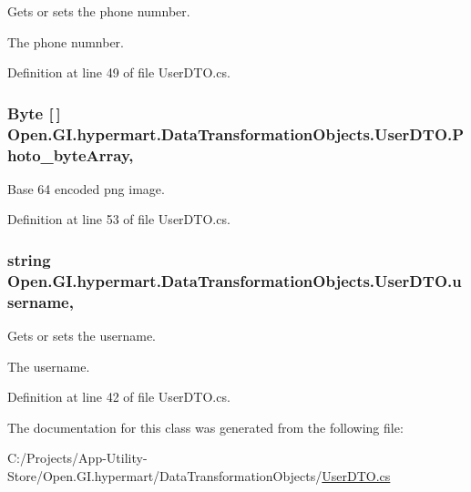 Gets or sets the phone numnber. 

The phone numnber. 

Definition at line 49 of file User\+D\+T\+O.\+cs.

\hypertarget{class_open_1_1_g_i_1_1hypermart_1_1_data_transformation_objects_1_1_user_d_t_o_a3e4447b4cd2ef861c95c1e9162cbceb1}{}
\subsubsection[{Photo\+\_\+byte\+Array}]{\setlength{\rightskip}{0pt plus 5cm}Byte \mbox{[}$\,$\mbox{]} Open.\+G\+I.\+hypermart.\+Data\+Transformation\+Objects.\+User\+D\+T\+O.\+Photo\+\_\+byte\+Array\hspace{0.3cm}{\ttfamily [get]}, {\ttfamily [set]}}\label{class_open_1_1_g_i_1_1hypermart_1_1_data_transformation_objects_1_1_user_d_t_o_a3e4447b4cd2ef861c95c1e9162cbceb1}


Base 64 encoded png image. 



Definition at line 53 of file User\+D\+T\+O.\+cs.

\hypertarget{class_open_1_1_g_i_1_1hypermart_1_1_data_transformation_objects_1_1_user_d_t_o_a123512619de906f987a3da0b7ec32bb1}{}
\subsubsection[{username}]{\setlength{\rightskip}{0pt plus 5cm}string Open.\+G\+I.\+hypermart.\+Data\+Transformation\+Objects.\+User\+D\+T\+O.\+username\hspace{0.3cm}{\ttfamily [get]}, {\ttfamily [set]}}\label{class_open_1_1_g_i_1_1hypermart_1_1_data_transformation_objects_1_1_user_d_t_o_a123512619de906f987a3da0b7ec32bb1}


Gets or sets the username. 

The username. 

Definition at line 42 of file User\+D\+T\+O.\+cs.



The documentation for this class was generated from the following file\+:\begin{DoxyCompactItemize}
\item 
C\+:/\+Projects/\+App-\/\+Utility-\/\+Store/\+Open.\+G\+I.\+hypermart/\+Data\+Transformation\+Objects/\hyperlink{_user_d_t_o_8cs}{User\+D\+T\+O.\+cs}\end{DoxyCompactItemize}
